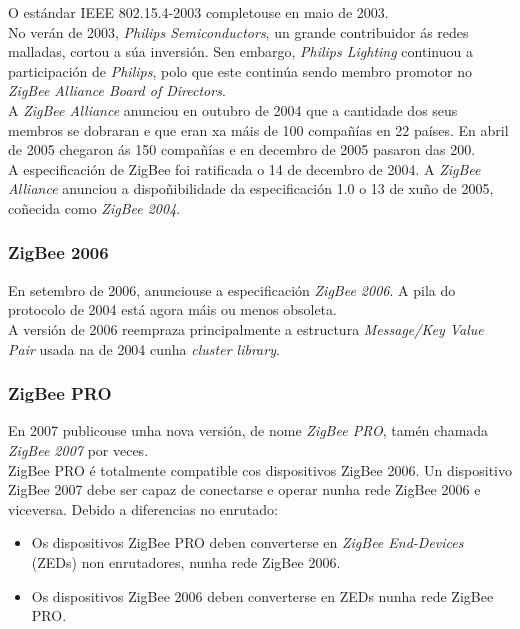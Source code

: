   O estándar IEEE 802.15.4-2003 completouse en maio de 2003. \\

  No verán de 2003, \textit{Philips Semiconductors}, un grande contribuidor ás
  redes malladas, cortou a súa inversión. Sen embargo,
  \textit{Philips Lighting} continuou a participación de \textit{Philips}, polo
  que este continúa sendo membro promotor no
  \textit{ZigBee Alliance Board of Directors}. \\

  A \textit{ZigBee Alliance} anunciou en outubro de 2004 que a cantidade dos
  seus membros se dobraran e que eran xa máis de 100 compañías en 22 países. En
  abril de 2005 chegaron ás 150 compañías e en decembro de 2005 pasaron das
  200. \\

  A especificación de ZigBee foi ratificada o 14 de decembro de 2004. A
  \textit{ZigBee Alliance} anunciou a dispoñibilidade da especificación 1.0 o
  13 de xuño de 2005, coñecida como \textit{ZigBee 2004}.

  \subsubsection{ZigBee 2006}

  En setembro de 2006, anunciouse a especificación \textit{ZigBee 2006}. A pila
  do protocolo de 2004 está agora máis ou menos obsoleta. \\

  A versión de 2006 reempraza principalmente a estructura
  \textit{Message/Key Value Pair} usada na de 2004 cunha
  \textit{cluster library}.

  \subsubsection{ZigBee PRO}

  En 2007 publicouse unha nova versión, de nome \textit{ZigBee PRO}, tamén
  chamada \textit{ZigBee 2007} por veces. \\

  ZigBee PRO é totalmente compatible cos dispositivos ZigBee 2006. Un
  dispositivo ZigBee 2007 debe ser capaz de conectarse e operar nunha rede
  ZigBee 2006 e viceversa. Debido a diferencias no enrutado:

  \begin{itemize}
   \item Os dispositivos ZigBee PRO deben converterse en
         \textit{ZigBee End-Devices} (ZEDs) non enrutadores, nunha rede ZigBee
         2006.
   \item Os dispositivos ZigBee 2006 deben converterse en ZEDs nunha rede
         ZigBee PRO.
  \end{itemize}

